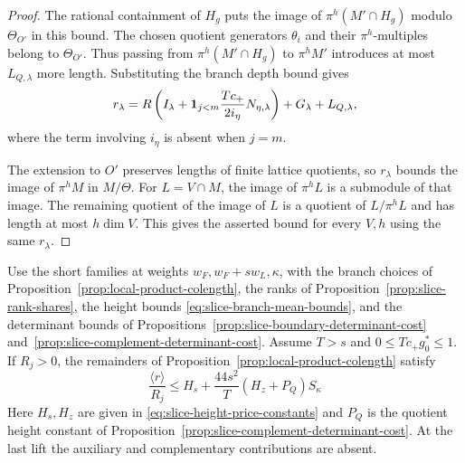 \begin{proof}
The rational containment of \(H_g\) puts the image of
\(\pi^h(M'\cap H_g)\) modulo \(\Theta_{O'}\) in this bound.
The chosen quotient generators \(\theta_i\) and their
\(\pi^h\)-multiples belong to \(\Theta_{O'}\). Thus passing
from \(\pi^h(M'\cap H_g)\) to \(\pi^hM'\) introduces at most
\(L_{Q,\lambda}\) more length. Substituting the branch depth
bound gives
\begin{equation}\label{eq:geometric-four-terms}
 r_\lambda=R\left(I_\lambda+
 {\bf1}_{j<m}\frac{Tc_+}{2i_\eta}N_{\eta,\lambda}\right)
                 +G_\lambda+L_{Q,\lambda},
\end{equation}
where the term involving \(i_\eta\) is absent when \(j=m\).

The extension to \(O'\) preserves lengths of finite lattice
quotients, so \(r_\lambda\) bounds the image of \(\pi^hM\) in
\(M/\Theta\). For \(L=V\cap M\), the image of \(\pi^hL\)
is a submodule of that image. The remaining quotient of
the image of \(L\) is a quotient of \(L/\pi^hL\) and has
length at most \(h\dim V\). This gives the asserted bound
for every \(V,h\) using the same \(r_\lambda\).

\end{proof}

\begin{proposition}\label{prop:global-product-colength}
Use the short families at weights \(w_F,w_F+s w_L,\kappa\),
with the branch choices of
Proposition~\ref{prop:local-product-colength}, the ranks of
Proposition~\ref{prop:slice-rank-shares}, the height bounds
\eqref{eq:slice-branch-mean-bounds}, and the determinant bounds
of Propositions~\ref{prop:slice-boundary-determinant-cost}
and~\ref{prop:slice-complement-determinant-cost}. Assume \(T>s\)
and \(0\le Tc_+g_0^*\le1\). If \(R_j>0\), the remainders of
Proposition~\ref{prop:local-product-colength} satisfy
\[
 \frac{\langle r\rangle}{R_j}
 \le H_s+\frac{44s^2}{T}(H_z+P_Q)S_\kappa
\]
Here \(H_s,H_z\) are given in \eqref{eq:slice-height-price-constants}
and \(P_Q\) is the quotient height constant of
Proposition~\ref{prop:slice-complement-determinant-cost}.
At the last lift the auxiliary
and complementary contributions are absent.
\end{proposition}


